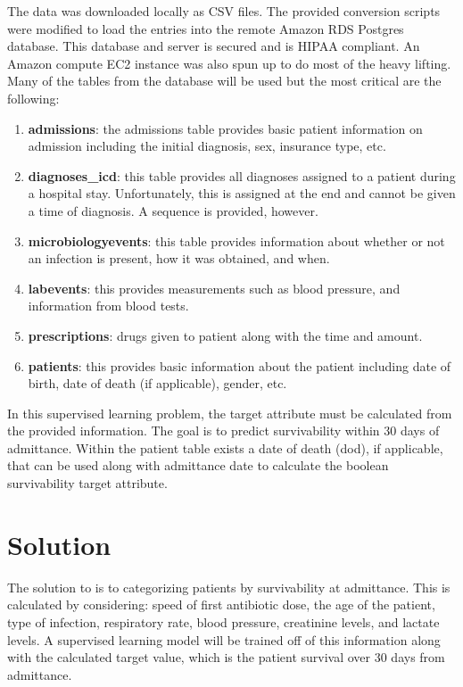 \documentclass[11pt]{article}
\begin{document}
	The data was downloaded locally as CSV files. The provided conversion scripts were modified to load the entries into the remote Amazon RDS Postgres database. This database and server is secured and is HIPAA compliant. An Amazon compute EC2 instance was also spun up to do most of the heavy lifting. Many of the tables from the database will be used but the most critical are the following:
	\begin{enumerate}
		\item \textbf{admissions}: the admissions table provides basic patient information on admission including the initial diagnosis, sex, insurance type, etc.
		\item \textbf{diagnoses\_icd}: this table provides all diagnoses assigned to a patient during a hospital stay. Unfortunately, this is assigned at the end and cannot be given a time of diagnosis. A sequence is provided, however.
		\item \textbf{microbiologyevents}: this table provides information about whether or not an infection is present, how it was obtained, and when.
		\item \textbf{labevents}: this provides measurements such as blood pressure, and information from blood tests.
		\item \textbf{prescriptions}: drugs given to patient along with the time and amount.
		\item \textbf{patients}: this provides basic information about the patient including date of birth, date of death (if applicable), gender, etc.
	\end{enumerate}
	
	In this supervised learning problem, the target attribute must be calculated from the provided information. The goal is to predict survivability within 30 days of admittance. Within the patient table exists a date of death (dod), if applicable, that can be used along with admittance date to calculate the boolean survivability target attribute.
	
	
	\section{Solution}
	The solution to is to categorizing patients by survivability at admittance. This is calculated by considering: speed of first antibiotic dose, the age of the patient, type of infection, respiratory rate, blood pressure, creatinine levels, and lactate levels. A supervised learning model will be trained off of this information along with the calculated target value, which is the patient survival over 30 days from admittance.
	
\end{document}
